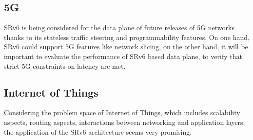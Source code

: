 {\subsection{5G}
SRv6 is being considered for the data plane of future releases of 5G networks thanks to its stateless traffic steering and programmability features. On one hand, SRv6 could support 5G features like network slicing, on the other hand, it will be important to evaluate the performance of SRv6 based data plane, to verify that strict 5G constraints on latency are met.
\subsection{Internet of Things}
Considering the problem space of Internet of Things, which includes scalability aspects, routing aspects, interactions between networking and application layers, the application of the SRv6 architecture seems very promising. 
}